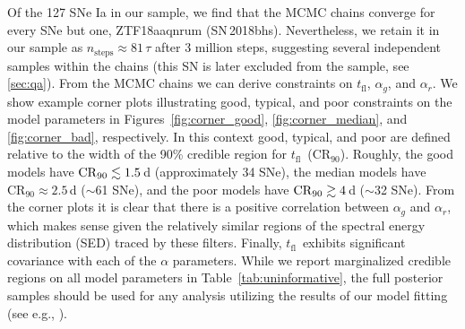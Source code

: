 \documentclass[twocolumn]{aastex63}
\newcommand{\tfl}{$t_\mathrm{fl}$}
\begin{document}
Of the 127 SNe Ia in our sample, we find that the MCMC chains converge for
every SNe but one, ZTF18aaqnrum (SN\,2018bhs). Nevertheless, we retain it in
our sample as $n_\mathrm{steps} \approx 81 \,\tau$ after 3 million steps,
suggesting several independent samples within the chains (this SN is later
excluded from the sample, see \ref{sec:qa}). From the MCMC chains we can
derive constraints on \tfl, $\alpha_g$, and $\alpha_r$. We show example corner
plots illustrating good, typical, and poor constraints on the model parameters
in Figures~\ref{fig:corner_good}, \ref{fig:corner_median}, and
\ref{fig:corner_bad}, respectively. In this context good, typical, and poor
are defined relative to the width of the 90\% credible region for \tfl\
($\mathrm{CR}_{90}$). Roughly, the good models have $\mathrm{CR}_{90} \lesssim
1.5$\,d (approximately 34 SNe), the median models have $\mathrm{CR}_{90}
\approx 2.5$\,d ($\sim$61 SNe), and the poor models have $\mathrm{CR}_{90} \gtrsim
4$\,d ($\sim$32 SNe). From the corner plots it is clear that there is a
positive correlation between $\alpha_g$ and $\alpha_r$, which makes sense
given the relatively similar regions of the spectral energy distribution (SED)
traced by these filters. Finally, \tfl\ exhibits significant covariance with
each of the $\alpha$ parameters. While we report marginalized credible regions
on all model parameters in Table~\ref{tab:uninformative}, the full posterior
samples should be used for any analysis utilizing the results of our model
fitting (see e.g., \citealt{Bulla20}).
\end{document}
